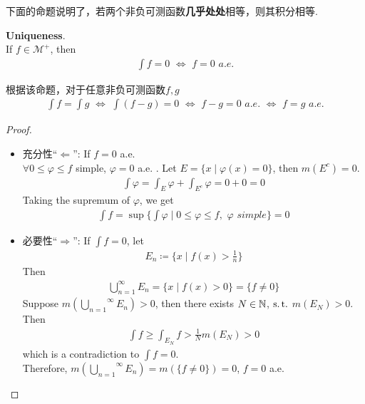 	 \vspace{2em}
	 下面的命题说明了，若两个非负可测函数\textbf{几乎处处}相等，则其积分相等.
	 \begin{proposition}\label{prop 3.1.3}
	 	\textbf{Uniqueness}.\\
	 	If $f \in \mathcal{M}^{+}$, then
	 	\begin{align}
	 		\int{f} = 0 \,\, \Leftrightarrow \,\, f = 0 \,\, a.e.
	 	\end{align}
 		
 		\vspace{1em}
 		\begin{rmk}
 			根据该命题，对于任意非负可测函数$f , g$
 			\begin{align}
 				\int{f} = \int{g} \,\, \Leftrightarrow \,\, \int{(f - g)} = 0 \,\, \Leftrightarrow \,\, f - g = 0 \,\, a.e. \,\, \Leftrightarrow \,\, f = g \,\, a.e.
 			\end{align}
 		\end{rmk}
 	
 		\vspace{2em}
 		\begin{proof}
 			\begin{itemize}
 				\item 充分性“$\Leftarrow$”: If $f = 0$ a.e.\\
 				$\forall 0 \leq \varphi \leq f$ simple, $\varphi = 0$ a.e. . Let $E = \{ x \mid \varphi(x) = 0 \}$, then $m(E^c) = 0$.
 				\begin{align}
 					\int{\varphi} = \int_{E}{\varphi} + \int_{E^c}{\varphi} = 0 + 0 = 0
 				\end{align}
 				Taking the supremum of $\varphi$, we get
 				\begin{align}
 					\int{f} = \sup{\{ \int{\varphi} \mid 0 \leq \varphi \leq f , \,\, \varphi \,\, simple \}} = 0
 				\end{align}
 				
 				\vspace{1em}
 				\item 必要性“$\Rightarrow$”: If $\int{f} = 0$, let
 				\begin{align}
 					E_n \coloneqq \{ x \mid f(x) > \frac{1}{n} \}
 				\end{align}
 				Then
 				\begin{align}
 					\bigcup_{n = 1}^{\infty}{E_n} = \{ x \mid f(x) > 0 \} = \{ f \neq 0 \}
 				\end{align}
 				Suppose $m(\overset{\infty}{\underset{n = 1}{\bigcup}}{E_n}) > 0$, then there exists $N \in \mathbb{N}$, $\operatorname{s.t.}$ $m(E_N) > 0$. Then
 				\begin{align}
 					\int{f} \geq \int_{E_N}{f} > \frac{1}{N}m(E_N) > 0
 				\end{align}
 				which is a contradiction to $\int{f} = 0$.\\
 				Therefore, $m(\overset{\infty}{\underset{n = 1}{\bigcup}}{E_n}) = m(\{ f \neq 0 \}) = 0$, $f = 0$ a.e.
 			\end{itemize}
 		\end{proof}
	 \end{proposition}
 
